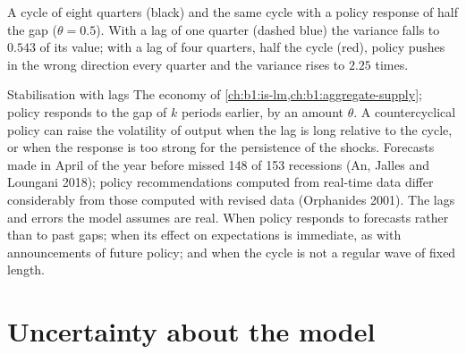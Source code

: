 \begin{omfigure}

{\small A cycle of eight quarters (black) and the same cycle with a policy
response of half the gap ($\theta = 0.5$). With a lag of one quarter (dashed blue) the
variance falls to $0.543$ of its value; with a lag of four quarters, half the
cycle (red), policy pushes in the wrong direction every quarter and the
variance rises to $2.25$ times.}
\end{omfigure}

\begin{model}{Stabilisation with lags}
\assumes The economy of \cref{ch:b1:is-lm,ch:b1:aggregate-supply}; policy
responds to the gap of $k$ periods earlier, by an amount $\theta$.
\predicts A countercyclical policy can raise the volatility of output
when the lag is long relative to the cycle, or when the response is too
strong for the persistence of the shocks.
\tested Forecasts made in April of the year before missed 148 of 153
recessions (An, Jalles and Loungani 2018); %
policy recommendations computed from real-time data differ considerably
from those computed with revised data (Orphanides 2001). %
The lags and errors the model assumes are real.
\breaks When policy responds to forecasts rather than to past gaps; when
its effect on expectations is immediate, as with announcements of future
policy; and when the cycle is not a regular wave of fixed length.
\end{model}

\section{Uncertainty about the model}\label{sec:b1:stabilisation-policy:uncertainty}

